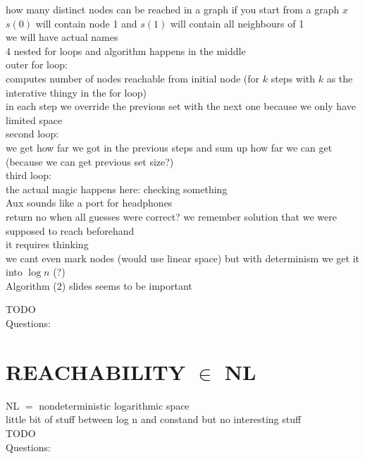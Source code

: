 \documentclass[a4]{scrartcl}
\begin{document}
how many distinct nodes can be reached in a graph if you start from a graph $x$ \\
$s(0)$ will contain node 1 and $s(1)$ will contain all neighbours of 1 \\
we will have actual names \\
4 nested for loops and algorithm happens in the middle \\
outer for loop: \\
computes number of nodes reachable from initial node (for $k$ steps with $k$ as the interative thingy in the for loop) \\
in each step we override the previous set with the next one because we only have limited space \\
second loop: \\
we get how far we got in the previous steps and sum up how far we can get (because we can get previous set size?) \\
third loop: \\
the actual magic happens here: checking something \\
Aux sounds like a port for headphones \\
return no when all guesses were correct? we remember solution that we were supposed to reach beforehand \\
it requires thinking \\
we cant even mark nodes (would use linear space) but with determinism we get it into $\log n$ (?) \\
Algorithm (2) slides seems to be important

\color{red} TODO \\
\color{black}
\color{violet} Questions:
\color{black}


\section*{REACHABILITY $\in$ NL}
NL $=$ nondeterministic logarithmic space \\
little bit of stuff between log n and constand but no interesting stuff \\

\color{red} TODO \\
\color{black}
\color{violet} Questions:
\color{black}






\newpage

\printbibliography
\end{document}
